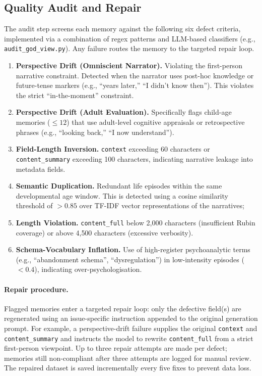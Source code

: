 \subsection{Quality Audit and Repair}
\label{app:stage_d}

The audit step screens each memory against the following six defect criteria, implemented via a combination of regex patterns and LLM-based classifiers (e.g., \texttt{audit\_god\_view.py}). Any failure routes the memory to the targeted repair loop.

\begin{enumerate}[leftmargin=1.5em, itemsep=4pt]
  \item \textbf{Perspective Drift (Omniscient Narrator).} Violating the first-person narrative constraint. Detected when the narrator uses post-hoc knowledge or future-tense markers (e.g., ``years later,'' ``I didn't know then''). This violates the strict ``in-the-moment'' constraint.

  \item \textbf{Perspective Drift (Adult Evaluation).} Specifically flags child-age memories ($\leq 12$) that use adult-level cognitive appraisals or retrospective phrases (e.g., ``looking back,'' ``I now understand'').

  \item \textbf{Field-Length Inversion.} \texttt{context} exceeding 60 characters or \texttt{content\_summary} exceeding 100 characters, indicating narrative leakage into metadata fields.

  \item \textbf{Semantic Duplication.} Redundant life episodes within the same developmental age window. This is detected using a cosine similarity threshold of $> 0.85$ over TF-IDF vector representations of the narratives; 

  \item \textbf{Length Violation.} \texttt{content\_full} below 2{,}000 characters (insufficient Rubin coverage) or above 4{,}500 characters (excessive verbosity).

  \item \textbf{Schema-Vocabulary Inflation.} Use of high-register psychoanalytic terms (e.g., ``abandonment schema'', ``dysregulation'') in low-intensity episodes ($< 0.4$), indicating over-psychologisation.
\end{enumerate}

\paragraph{Repair procedure.}
Flagged memories enter a targeted repair loop: only the defective field(s) are regenerated using an issue-specific instruction appended to the original generation prompt. For example, a perspective-drift failure supplies the original \texttt{context} and \texttt{content\_summary} and instructs the model to rewrite \texttt{content\_full} from a strict first-person viewpoint. Up to three repair attempts are made per defect; memories still non-compliant after three attempts are logged for manual review. The repaired dataset is saved incrementally every five fixes to prevent data loss.

